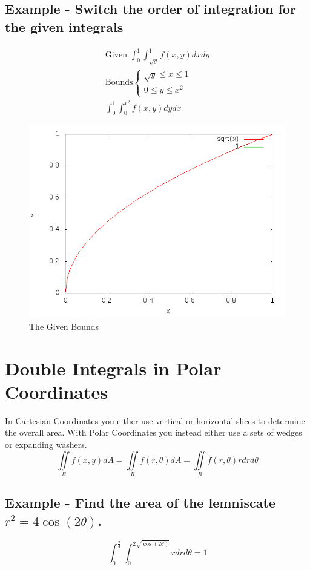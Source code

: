 \documentclass{article}
\begin{document}
    \subsection{Example - Switch the order of integration for the given integrals}
    \[
    \begin{aligned}
    \text{Given } \int_0^1 \int_{\sqrt{y}}^1 f(x,y) dxdy\\
    \text{Bounds}\begin{cases}
    \sqrt{y} \le x \le 1\\
    0 \le y \le x^2
    \end{cases}\\
    \int_0^1 \int_0^{x^2} f(x,y) dydx
    \end{aligned}
    \]
    \begin{figure}[ht]
    \centering
        \includegraphics[scale=0.25]{example.png}
    \caption{The Given Bounds}
    \end{figure}

\section{Double Integrals in Polar Coordinates}
In Cartesian Coordinates you either use vertical or horizontal slices to determine the overall area. With Polar Coordinates you instead either use a sets of wedges or expanding washers.
\[
\iint\limits_R f(x,y)dA = \iint\limits_R f(r, \theta) dA = \iint\limits_R f(r, \theta) rdrd\theta
\]
    \subsection{Example - Find the area of the lemniscate $r^2 = 4\cos(2\theta)$.}
    \[
    \int_0^{\frac{\pi}{4}} \int_0^{2 \sqrt{\cos(2\theta)}} rdrd\theta = 1
    \]
\end{document}
